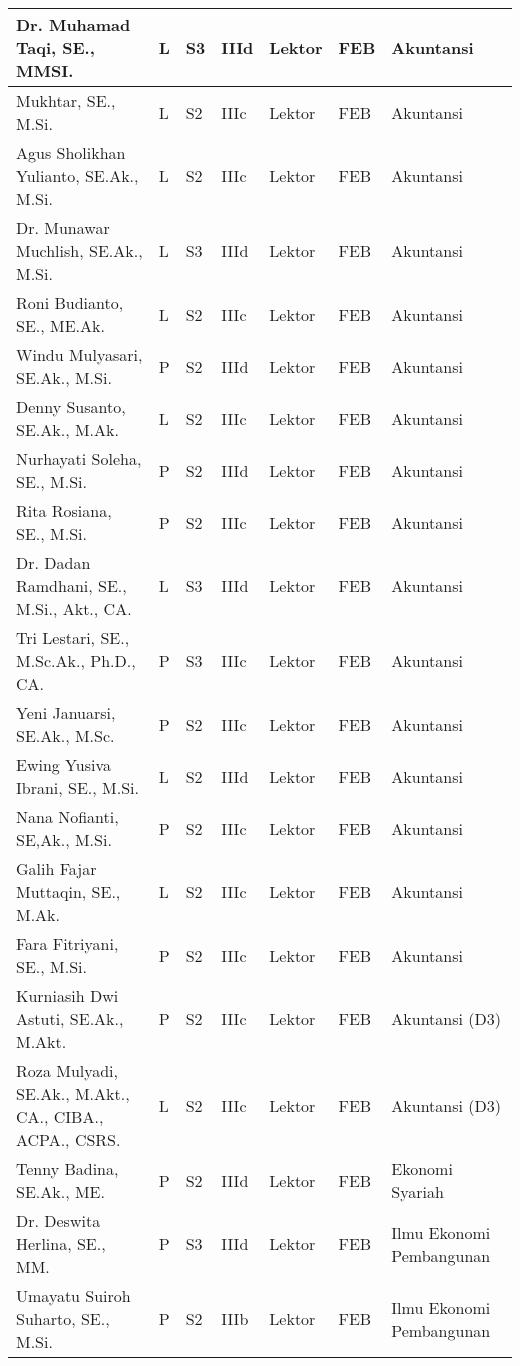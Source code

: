 \documentclass[
]{book}
\begin{document}
\begin{longtable}{l|l|l|l|l|l|l}
\hline
Dr. Muhamad Taqi, SE., MMSI. & L & S3 & IIId & Lektor & FEB & Akuntansi\\
\hline
Mukhtar, SE., M.Si. & L & S2 & IIIc & Lektor & FEB & Akuntansi\\
\hline
Agus Sholikhan Yulianto, SE.Ak., M.Si. & L & S2 & IIIc & Lektor & FEB & Akuntansi\\
\hline
Dr. Munawar Muchlish, SE.Ak., M.Si. & L & S3 & IIId & Lektor & FEB & Akuntansi\\
\hline
Roni Budianto, SE., ME.Ak. & L & S2 & IIIc & Lektor & FEB & Akuntansi\\
\hline
Windu Mulyasari, SE.Ak., M.Si. & P & S2 & IIId & Lektor & FEB & Akuntansi\\
\hline
Denny Susanto, SE.Ak., M.Ak. & L & S2 & IIIc & Lektor & FEB & Akuntansi\\
\hline
Nurhayati Soleha, SE., M.Si. & P & S2 & IIId & Lektor & FEB & Akuntansi\\
\hline
Rita Rosiana, SE., M.Si. & P & S2 & IIIc & Lektor & FEB & Akuntansi\\
\hline
Dr. Dadan Ramdhani, SE., M.Si., Akt., CA. & L & S3 & IIId & Lektor & FEB & Akuntansi\\
\hline
Tri Lestari, SE., M.Sc.Ak., Ph.D., CA. & P & S3 & IIIc & Lektor & FEB & Akuntansi\\
\hline
Yeni Januarsi, SE.Ak., M.Sc. & P & S2 & IIIc & Lektor & FEB & Akuntansi\\
\hline
Ewing Yusiva Ibrani, SE., M.Si. & L & S2 & IIId & Lektor & FEB & Akuntansi\\
\hline
Nana Nofianti, SE,Ak., M.Si. & P & S2 & IIIc & Lektor & FEB & Akuntansi\\
\hline
Galih Fajar Muttaqin, SE., M.Ak. & L & S2 & IIIc & Lektor & FEB & Akuntansi\\
\hline
Fara Fitriyani, SE., M.Si. & P & S2 & IIIc & Lektor & FEB & Akuntansi\\
\hline
Kurniasih Dwi Astuti, SE.Ak., M.Akt. & P & S2 & IIIc & Lektor & FEB & Akuntansi (D3)\\
\hline
Roza Mulyadi, SE.Ak., M.Akt., CA., CIBA., ACPA., CSRS. & L & S2 & IIIc & Lektor & FEB & Akuntansi (D3)\\
\hline
Tenny Badina, SE.Ak., ME. & P & S2 & IIId & Lektor & FEB & Ekonomi Syariah\\
\hline
Dr. Deswita Herlina, SE., MM. & P & S3 & IIId & Lektor & FEB & Ilmu Ekonomi Pembangunan\\
\hline
Umayatu Suiroh Suharto, SE., M.Si. & P & S2 & IIIb & Lektor & FEB & Ilmu Ekonomi Pembangunan\\

\end{longtable}
\end{document}
